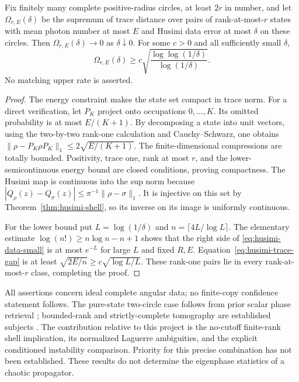 \begin{proposition}
Fix finitely many complete positive-radius circles, at least $2r$ in number,
and let $\Omega_{r,E}(\delta)$ be the supremum of trace distance over pairs of
rank-at-most-$r$ states with mean photon number at most $E$ and Husimi data
error at most $\delta$ on these circles. Then $\Omega_{r,E}(\delta)\to0$ as
$\delta\downarrow0$. For some $c>0$ and all sufficiently small $\delta$,
\[
 \Omega_{r,E}(\delta)\ge
 c\sqrt{\frac{\log\log(1/\delta)}{\log(1/\delta)}}.
 \tag{H.3}\label{eq:husimi-modulus}
\]
No matching upper rate is asserted.
\end{proposition}
\begin{proof}
The energy constraint makes the state set compact in trace norm. For a direct
verification, let $P_K$ project onto occupations $0,\ldots,K$. Its omitted
probability is at most $E/(K+1)$. By decomposing a state into unit vectors,
using the two-by-two rank-one calculation and Cauchy--Schwarz, one obtains
$\|\rho-P_K\rho P_K\|_1\le2\sqrt{E/(K+1)}$. The finite-dimensional
compressions are totally bounded. Positivity, trace one, rank at most $r$,
and the lower-semicontinuous energy bound are closed conditions, proving
compactness. The Husimi map is continuous into the sup norm because
$|Q_\rho(z)-Q_\sigma(z)|\le\pi^{-1}\|\rho-\sigma\|_1$. It is injective on
this set by Theorem~\ref{thm:husimi-shell}, so its inverse on its image is
uniformly continuous.

For the lower bound put $L=\log(1/\delta)$ and
$n=\lceil4L/\log L\rceil$. The elementary estimate
$\log(n!)\ge n\log n-n+1$ shows that the right side of
\eqref{eq:husimi-data-small} is at most $e^{-L}$ for large $L$ and fixed
$R,E$. Equation~\eqref{eq:husimi-trace-gap} is at least
$\sqrt{2E/n}\ge c\sqrt{\log L/L}$. These rank-one pairs lie in every
rank-at-most-$r$ class, completing the proof.
\end{proof}

All assertions concern ideal complete angular data; no finite-copy confidence
statement follows. The pure-state two-circle case follows from prior scalar
phase retrieval \cite{Perez2021}; bounded-rank and strictly-complete tomography
are established subjects \cite{BDK2016}. The contribution relative to this
project is the no-cutoff finite-rank shell implication, its normalized
Laguerre ambiguities, and the explicit conditioned instability comparison.
Priority for this precise combination has not been established. These
results do not determine the eigenphase statistics of a chaotic propagator.
